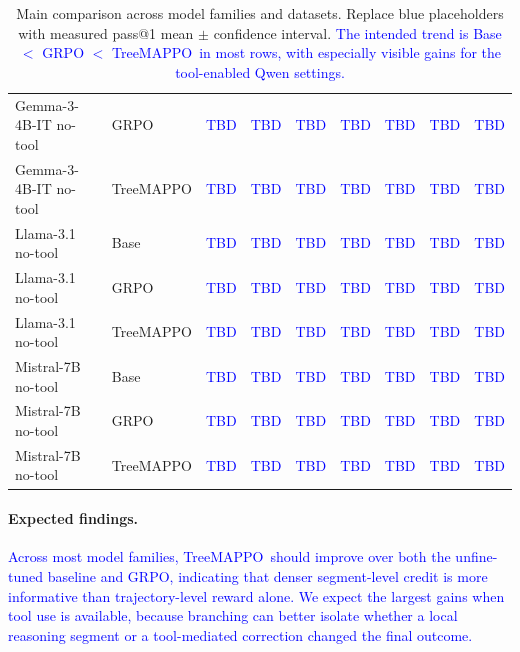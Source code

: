\documentclass[letterpaper]{article} %
\newcommand{\ours}{TreeMAPPO}
\newcommand{\expected}[1]{\textcolor{blue}{#1}}
\begin{document}
\begin{table}[t]
{\begin{tabular}{llccccccc}
Gemma-3-4B-IT no-tool & GRPO & \expected{TBD} & \expected{TBD} & \expected{TBD} & \expected{TBD} & \expected{TBD} & \expected{TBD} & \expected{TBD} \\
Gemma-3-4B-IT no-tool & \ours & \expected{TBD} & \expected{TBD} & \expected{TBD} & \expected{TBD} & \expected{TBD} & \expected{TBD} & \expected{TBD} \\
\hline
Llama-3.1 no-tool & Base & \expected{TBD} & \expected{TBD} & \expected{TBD} & \expected{TBD} & \expected{TBD} & \expected{TBD} & \expected{TBD} \\
Llama-3.1 no-tool & GRPO & \expected{TBD} & \expected{TBD} & \expected{TBD} & \expected{TBD} & \expected{TBD} & \expected{TBD} & \expected{TBD} \\
Llama-3.1 no-tool & \ours & \expected{TBD} & \expected{TBD} & \expected{TBD} & \expected{TBD} & \expected{TBD} & \expected{TBD} & \expected{TBD} \\
\hline
Mistral-7B no-tool & Base & \expected{TBD} & \expected{TBD} & \expected{TBD} & \expected{TBD} & \expected{TBD} & \expected{TBD} & \expected{TBD} \\
Mistral-7B no-tool & GRPO & \expected{TBD} & \expected{TBD} & \expected{TBD} & \expected{TBD} & \expected{TBD} & \expected{TBD} & \expected{TBD} \\
Mistral-7B no-tool & \ours & \expected{TBD} & \expected{TBD} & \expected{TBD} & \expected{TBD} & \expected{TBD} & \expected{TBD} & \expected{TBD} \\
\hline
\end{tabular}%
}
\caption{Main comparison across model families and datasets. Replace blue placeholders with measured pass@1 mean $\pm$ confidence interval. \expected{The intended trend is Base $<$ GRPO $<$ \ours\ in most rows, with especially visible gains for the tool-enabled Qwen settings.}}
\label{tab:main-results}
\end{table}

\paragraph{Expected findings.}
\expected{Across most model families, \ours\ should improve over both the unfine-tuned baseline and GRPO, indicating that denser segment-level credit is more informative than trajectory-level reward alone. We expect the largest gains when tool use is available, because branching can better isolate whether a local reasoning segment or a tool-mediated correction changed the final outcome.}
\end{document}

